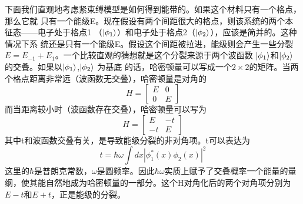 下面我们直观地考虑紧束缚模型是如何得到能带的。如果这个材料只有一个格点，那么它就
只有一个能级E。现在假设有两个间距很大的格点，则该系统的两个本征态——电子处于格点1
（$\ket{\phi_1}$）和电子处于格点2（$\ket{\phi_2}$），应该是简并的。这种情况下系
统还是只有一个能级E。假设这个间距被拉进，能级则会产生一些分裂$E =
E_{-1} + E_{1}$。一个比较直观的猜想就是这个分裂来源于两个波函数
$\ket{\phi_1}$和$\ket{\phi_2}$的交叠。如果以$\ket{\phi_1}$,$\ket{\phi_2}$ 为基底
的话，哈密顿量可以写成一个$2 \times 2$的矩阵。当两个格点距离非常远（波函数无交叠），哈密顿量是对角的
\begin{equation}
H =
\begin{bmatrix} 

    E & 0 \\

      0 & E

    \end{bmatrix}
    \end{equation}
而当距离较小时（波函数存在交叠），哈密顿量可以写为
\begin{equation}
H = 
\begin{bmatrix} 

    E & -t \\

      -t & E

    \end{bmatrix}
\end{equation}
其中t和波函数交叠有关，是导致能级分裂的非对角项。t可以表达为
\begin{equation}
  t = \hbar \omega \int{dx}|\phi_1^*(x) \phi_2(x)|^2
\end{equation}
这里的$\hbar$是普朗克常数，$\omega$是圆频率。因此$\hbar \omega$实质上赋予了交叠概率一个能量的量纲，使其能自然地成为哈密顿量的一部分。这个H对角化后的两个对角项分别为$E-t$和$E+t$，正是能级的分裂。
